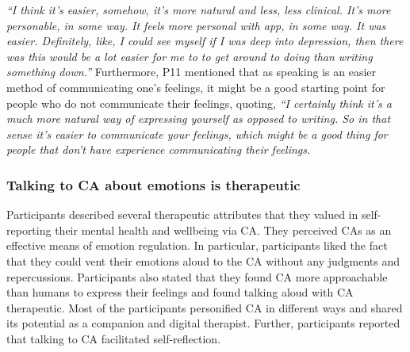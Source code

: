                 \textit{``I think it's easier, somehow, it's more natural and less, less clinical. It's more personable, in some way.
                It feels more personal with \acl{app}, in some way. It was easier. Definitely, like, I could see myself if I was deep into depression, then there was this would be a lot easier for me to to get around to doing than writing something down.''}
        Furthermore, P11 mentioned that as speaking is an easier method of communicating one's feelings, it might be a good starting point for people who do not communicate their feelings, quoting,
                \textit{
                ``I certainly think it's a much more natural way of expressing yourself as opposed to writing. 
                So in that sense it's easier to communicate your feelings, which might be a good thing for people that don't have experience communicating their feelings.
                }
            
        

\subsubsection{Talking to \ac{CA} about emotions is therapeutic}
\label{sec:emotional_venting}
    
    Participants described several therapeutic attributes that they valued in self-reporting their mental health and wellbeing via \ac{CA}. 
    They perceived \acp{CA} as an effective means of emotion regulation. 
    In particular, participants liked the fact that they could vent their emotions aloud to the \ac{CA} without any judgments and repercussions.
    Participants also stated that they found \ac{CA} more approachable than humans to express their feelings and found talking aloud with \ac{CA} therapeutic.
    Most of the participants personified \ac{CA} in different ways and shared its potential as a companion and digital therapist.
    Further, participants reported that talking to \ac{CA} facilitated self-reflection.
    
